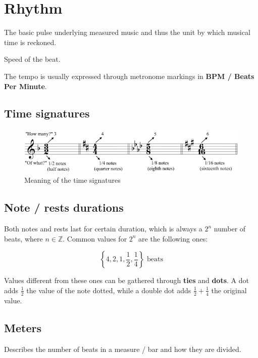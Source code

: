 \section{Rhythm}
\begin{definition}
    The basic pulse underlying measured music and thus the unit by which musical time is reckoned.
\end{definition}

\begin{definition}[Tempo]
    Speed of the beat.
\end{definition}
The tempo is usually expressed through metronome markings in \textbf{BPM / Beats Per Minute}.

\subsection{Time signatures}

\begin{figure}[h]
    \begin{center}
        \includegraphics[width=1\textwidth]{img/timesignature}
        \caption{Meaning of the time signatures}
    \end{center}
\end{figure}

\subsection{Note / rests durations}
Both notes and rests last for certain duration, which is always a $2^n$ number of beats, where $n \in \mathbb Z$. Common values for $2^n$ are the following ones:

$$\left\{4,2,1,\frac{1}{2}, \frac{1}{4}\right\} \text{ beats}$$

Values different from these ones can be gathered through \textbf{ties} and \textbf{dots}. A dot adds $\frac{1}{2}$ the value of the note dotted, while a double dot adds $\frac{1}{2} + \frac{1}{4}$ the original value.

\subsection{Meters}
\begin{definition}[Meter]
    Describes the number of beats in a measure / bar and how they are divided.
\end{definition}

